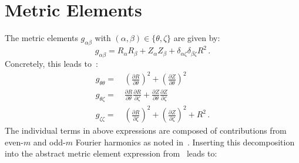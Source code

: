 \FloatBarrier
\section{Metric Elements} \label{sec:metric_elements}
The metric elements $g_{\alpha \beta}$ with $(\alpha, \beta) \in \{ \theta, \zeta \}$ are given by:
\begin{equation}
  g_{\alpha \beta} = R_\alpha R_\beta + Z_\alpha Z_\beta + \delta_{\alpha \zeta} \delta_{\beta \zeta} R^2 \, . \label{eqn:metric_elements_abstract}
\end{equation}
Concretely, this leads to~\cite{geiger_calc_current_in_prout}:
\begin{align}
  g_{\theta \theta} =&\, \left( \frac{\partial R}{\partial \theta} \right)^2 + \left( \frac{\partial Z}{\partial \theta} \right)^2 \\
  g_{\theta \zeta } =&\, \frac{\partial R}{\partial \theta} \frac{\partial R}{\partial \zeta} + \frac{\partial Z}{\partial \theta} \frac{\partial Z}{\partial \zeta} \\
  g_{\zeta  \zeta } =&\, \left( \frac{\partial R}{\partial \zeta } \right)^2 + \left( \frac{\partial Z}{\partial \zeta } \right)^2 + R^2 \, .
\end{align}
The individual terms in above expressions are composed of contributions from even-$m$ and odd-$m$ Fourier harmonics as noted in~.
Inserting this decomposition into the abstract metric element expression from~ leads to:
